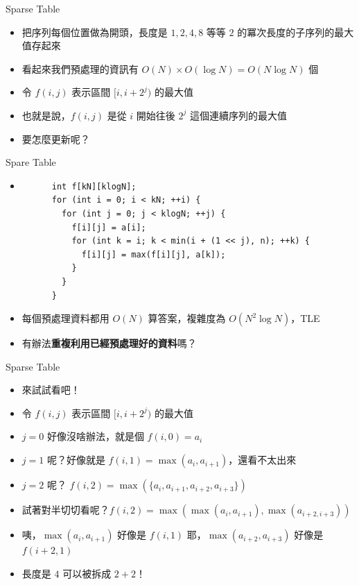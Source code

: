 \documentclass[standalone]{beamer}
\begin{document}
\begin{frame}{Sparse Table}
  \begin{itemize}
    \item 把序列每個位置做為開頭，長度是 $1, 2, 4, 8$ 等等 $2$ 的冪次長度的子序列的最大值存起來
    \item 看起來我們預處理的資訊有 $O(N) \times O(\log N) = O(N \log N)$ 個
    \item 令 \(f(i, j)\) 表示區間 \([i, i+2^j)\) 的最大值
    \item 也就是說，$f(i, j)$ 是從 $i$ 開始往後 $2^j$ 這個連續序列的最大值
    \item 要怎麼更新呢？
  \end{itemize}
\end{frame}

\begin{frame}[fragile]{Spare Table}
  \begin{itemize}
    \item 
    \begin{verbatim}
      int f[kN][klogN];
      for (int i = 0; i < kN; ++i) {
        for (int j = 0; j < klogN; ++j) {
          f[i][j] = a[i];
          for (int k = i; k < min(i + (1 << j), n); ++k) {
            f[i][j] = max(f[i][j], a[k]);
          }
        }
      }
    \end{verbatim}
    \item 每個預處理資料都用 $O(N)$ 算答案，複雜度為 $O(N^2 \log N)$，TLE
    \item 有辦法\textbf{重複利用已經預處理好的資料}嗎？
  \end{itemize}
\end{frame}

\begin{frame}[fragile]{Sparse Table}
  \begin{itemize}
    \item 來試試看吧！
    \item 令 \(f(i, j)\) 表示區間 \([i, i+2^j)\) 的最大值
    \item $j = 0$ 好像沒啥辦法，就是個 $f(i, 0) = a_i$
    \item $j = 1$ 呢？好像就是 $f(i, 1) = \max(a_i, a_{i + 1})$，還看不太出來
    \item $j = 2$ 呢？ $f(i, 2) = \max(\{a_i, a_{i + 1}, a_{i + 2}, a_{i + 3}\})$
    \item 試著對半切切看呢？$f(i, 2) = \max(\max(a_i, a_{i + 1}), \max(a_{i + 2, i + 3}))$
    \item 咦，$\max(a_i, a_{i + 1})$ 好像是 $f(i, 1)$ 耶，$\max(a_{i + 2}, a_{i + 3})$ 好像是 $f(i + 2, 1)$
    \item 長度是 $4$ 可以被拆成 $2 + 2$！
  \end{itemize}
\end{frame}
\end{document}
